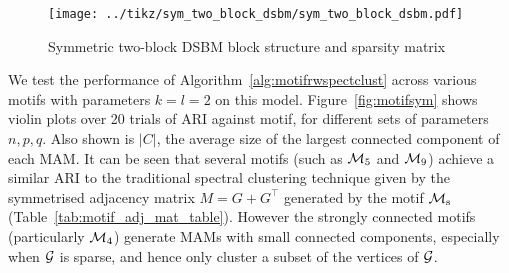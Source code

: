 \begin{figure}[H]
	\centering
	\texttt{[image: ../tikz/sym\_two\_block\_dsbm/sym\_two\_block\_dsbm.pdf]}
	\caption{Symmetric two-block DSBM block structure and sparsity matrix}
	\label{fig:sym_two_block_dsbm}
\end{figure}


We test the performance of Algorithm~\ref{alg:motifrwspectclust} across various motifs with parameters $k=l=2$ on this model.
Figure~\ref{fig:motifsym} shows violin plots over 20 trials of ARI against motif, for different sets of parameters $n,p,q$.
Also shown is $|C|$, the average size of the largest connected component of each MAM.
It can be seen that several motifs (such as $\mathcal{M}_5$ and $\mathcal{M}_9$) achieve a similar ARI to the traditional spectral clustering technique given by the symmetrised adjacency matrix $M=G+G^\top$ generated by the motif $\mathcal{M}_\mathrm{s}$ (Table~\ref{tab:motif_adj_mat_table}).
However the strongly connected motifs (particularly $\mathcal{M}_4$) generate MAMs with small connected components, especially when $\mathcal{G}$ is sparse, and hence only cluster a subset of the vertices of $\mathcal{G}$. 


